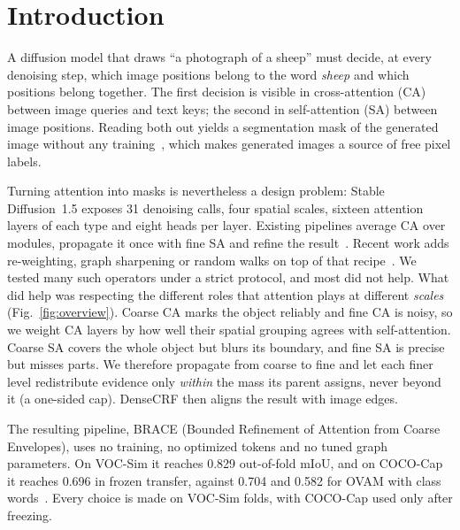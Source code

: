 \section{Introduction}
\label{sec:intro}
A diffusion model that draws ``a photograph of a sheep'' must decide, at every denoising step, which image positions belong to the word \emph{sheep} and which positions belong together. The first decision is visible in cross-attention (CA) between image queries and text keys; the second in self-attention (SA) between image positions. Reading both out yields a segmentation mask of the generated image without any training~\cite{tang2023daam,marcosmanchon2024ovam}, which makes generated images a source of free pixel labels.

Turning attention into masks is nevertheless a design problem: Stable Diffusion~1.5 exposes 31 denoising calls, four spatial scales, sixteen attention layers of each type and eight heads per layer. Existing pipelines average CA over modules, propagate it once with fine SA and refine the result~\cite{marcosmanchon2024ovam}. Recent work adds re-weighting, graph sharpening or random walks on top of that recipe~\cite{meng2026making,mahatha2025nerve,mahatha2026spark,park2025seediff}. We tested many such operators under a strict protocol, and most did not help. What did help was respecting the different roles that attention plays at different \emph{scales} (Fig.~\ref{fig:overview}). Coarse CA marks the object reliably and fine CA is noisy, so we weight CA layers by how well their spatial grouping agrees with self-attention. Coarse SA covers the whole object but blurs its boundary, and fine SA is precise but misses parts. We therefore propagate from coarse to fine and let each finer level redistribute evidence only \emph{within} the mass its parent assigns, never beyond it (a one-sided cap). DenseCRF then aligns the result with image edges.

The resulting pipeline, BRACE (Bounded Refinement of Attention from Coarse Envelopes), uses no training, no optimized tokens and no tuned graph parameters. On VOC-Sim it reaches 0.829 out-of-fold mIoU, and on COCO-Cap it reaches 0.696 in frozen transfer, against 0.704 and 0.582 for OVAM with class words~\cite{marcosmanchon2024ovam}. Every choice is made on VOC-Sim folds, with COCO-Cap used only after freezing.

